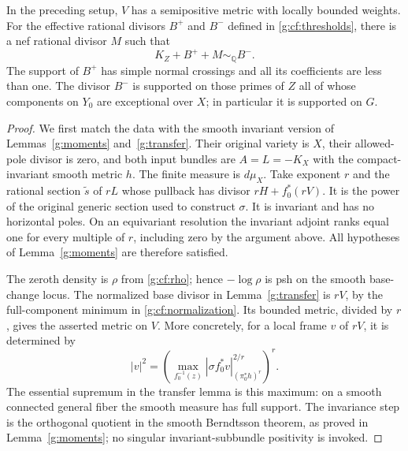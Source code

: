 \begin{lemma}\label{g:cf:metric-conclusions}
In the preceding setup, $V$ has a semipositive metric with locally bounded
weights. For the effective rational divisors $B^+$ and $B^-$ defined
in \eqref{g:cf:thresholds}, there is a nef rational divisor $M$ such that
\begin{equation}\label{g:cf:log-relation}
 K_Z+B^++M\sim_{\mathbb Q}B^-.
\end{equation}
The support of $B^+$ has simple normal crossings and all its coefficients
are less than one.  The divisor $B^-$ is supported on those primes of $Z$ all of whose
components on $Y_0$ are exceptional over $X$; in particular it is
supported on $G$.
\end{lemma}

\begin{proof}
We first match the data with the smooth invariant version of
Lemmas~\ref{g:moments} and~\ref{g:transfer}. Their original variety is
$X$, their allowed-pole divisor is zero, and both input bundles are
$A=L=-K_X$ with the compact-invariant smooth metric $h$. The finite
measure is $d\mu_X$. Take exponent $r$ and the rational section
$\widetilde s$ of $rL$ whose pullback has divisor $rH+f_0^*(rV)$.
It is the power of the original generic section used to construct
$\sigma$. It is invariant and has no horizontal poles. On an equivariant
resolution the invariant adjoint ranks equal one for every multiple of
$r$, including zero by the argument above. All hypotheses of
Lemma~\ref{g:moments} are therefore satisfied.

The zeroth density is $\rho$ from \eqref{g:cf:rho}; hence
$-\log\rho$ is psh on the smooth base-change locus. The normalized
base divisor in Lemma~\ref{g:transfer} is $rV$, by the full-component
minimum in \eqref{g:cf:normalization}. Its bounded metric, divided by
$r$, gives the asserted metric on $V$. More concretely, for a local frame
$v$ of $rV$, it is determined by
\[
 |v|^2=\left(\max_{f_0^{-1}(z)}
      |\sigma f_0^*v|_{(\pi_0^*h)^r}^{2/r}\right)^r.
\]
The essential supremum in the transfer lemma is this maximum: on a
smooth connected general fiber the smooth measure has full support.
The invariance step is the orthogonal quotient in the smooth
Berndtsson theorem, as proved in Lemma~\ref{g:moments}; no singular
invariant-subbundle positivity is invoked.


\end{proof}
